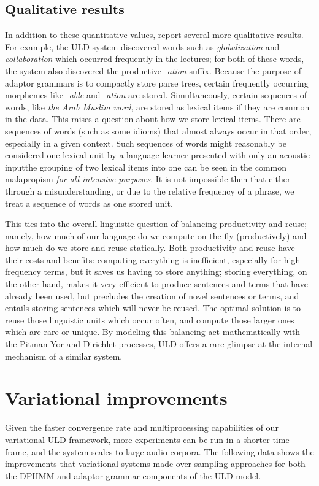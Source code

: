 \documentclass[12pt,letterpaper]{article}
\begin{document}
\subsection{Qualitative results}
In addition to these quantitative values, \citet{lee:2015} report several more qualitative results. For example, the ULD system discovered words such as \textit{globalization} and \textit{collaboration} which occurred frequently in the lectures; for both of these words, the system also discovered the productive \textit{-ation} suffix. Because the purpose of adaptor grammars is to compactly store parse trees, certain frequently occurring morphemes like \textit{-able} and \textit{-ation} are stored. Simultaneously, certain sequences of words, like \textit{the Arab Muslim word}, are stored as lexical items if they are common in the data. This raises a question about how we store lexical items. There are sequences of words (such as some idioms) that almost always occur in that order, especially in a given context. Such sequences of words might reasonably be considered one lexical unit by a language learner presented with only an acoustic input\textemdash  the grouping of two lexical items into one can be seen in the common malapropism \textit{for all intensive purposes}. It is not impossible then that either through a misunderstanding, or due to the relative frequency of a phrase, we treat a sequence of words as one stored unit. 

This ties into the overall linguistic question of balancing productivity and reuse; namely, how much of our language do we compute on the fly (productively) and how much do we store and reuse statically. Both productivity and reuse have their costs and benefits: computing everything is inefficient, especially for high-frequency terms, but it saves us having to store anything; storing everything, on the other hand, makes it very efficient to produce sentences and terms that have already been used, but precludes the creation of novel sentences or terms, and entails storing sentences which will never be reused. The optimal solution is to reuse those linguistic units which occur often, and compute those larger ones which are rare or unique. By modeling this balancing act mathematically with the Pitman-Yor and Dirichlet processes, ULD offers a rare glimpse at the internal mechanism of a similar system. 

\section{Variational improvements}
Given the faster convergence rate and multiprocessing capabilities of our variational ULD framework, more experiments can be run in a shorter time-frame, and the system scales to large audio corpora. The following data shows the improvements that variational systems made over sampling approaches for both the DPHMM and adaptor grammar components of the ULD model. 
\end{document}
